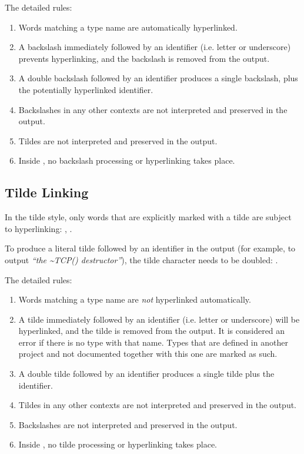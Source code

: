 The detailed rules:

\begin{enumerate}
  \item Words matching a type name are automatically hyperlinked.
  \item A backslash immediately followed by an identifier (i.e. letter or underscore)
        prevents hyperlinking, and the backslash is removed from the output.
  \item A double backslash followed by an identifier produces a single backslash,
        plus the potentially hyperlinked identifier.
  \item Backslashes in any other contexts are not interpreted and preserved in the output.
  \item Tildes are not interpreted and preserved in the output.
  \item Inside , no backslash processing or hyperlinking takes place.
\end{enumerate}

\subsection{Tilde Linking}
\label{sec:neddoc:tilde-linking}

In the tilde style, only words that are explicitly marked with a tilde are
subject to hyperlinking: ,
.

To produce a literal tilde followed by an identifier in the output (for example,
to output \textit{``the {\textasciitilde}TCP() destructor''}), the tilde character
needs to be doubled: .

The detailed rules:

\begin{enumerate}
  \item Words matching a type name are \textit{not} hyperlinked automatically.
  \item A tilde immediately followed by an identifier (i.e. letter or underscore)
        will be hyperlinked, and the tilde is removed from the output. It is
        considered an error if there is no type with that name. Types that are
        defined in another project and not documented together with this one are
        marked as such.
  \item A double tilde followed by an identifier produces a single tilde plus the identifier.
  \item Tildes in any other contexts are not interpreted and preserved in the output.
  \item Backslashes are not interpreted and preserved in the output.
  \item Inside , no tilde processing or hyperlinking takes place.
\end{enumerate}

